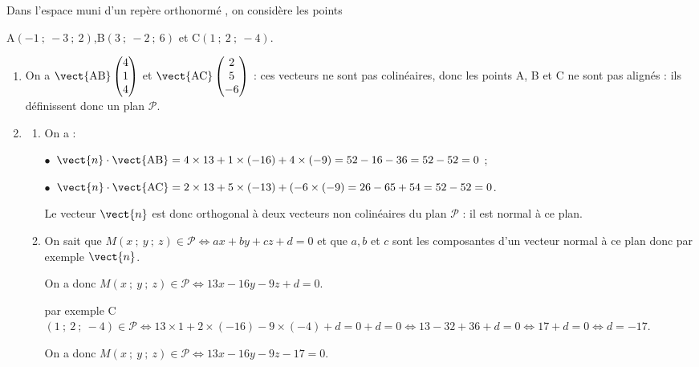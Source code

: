 \medskip

Dans l'espace muni d'un repère orthonormé \Oijk, on considère les
points
\begin{center}A$(-1~;~-3~;~2)$,\qquad B$(3~;~-2~;~6)$ \quad et \quad  C$(1~;~2~;~-4)$.\end{center}

\smallskip

\begin{enumerate}
\item 
On a $\vect{\text{AB}}\begin{pmatrix}4\\1\\4\end{pmatrix}$ et $\vect{\text{AC}}\begin{pmatrix}2\\5\\-6\end{pmatrix}$ : ces vecteurs ne sont pas colinéaires, donc les points A, B et C ne sont pas alignés : ils définissent donc un plan $\mathcal{P}$.
\item 
	\begin{enumerate}
		\item 
On a :

$\bullet~~$$\vect{n} \cdot \vect{\text{AB}} = 4 \times 13 + 1 \times (- 16) + 4 \times (-9) = 52 - 16 - 36 = 52 - 52 = 0$ ;

$\bullet~~$$\vect{n} \cdot \vect{\text{AC}} = 2 \times 13 + 5 \times (- 13) + (- 6 \times (-9) = 26 - 65 + 54  = 52 - 52 = 0$.

Le vecteur $\vect{n}$ est donc orthogonal à deux vecteurs non colinéaires du plan $\mathcal{P}$ : il est normal à ce plan.
		\item 
On sait que $M(x~;~y~;~z) \in \mathcal{P} \iff ax + by + cz + d = 0$ et que $a, b $ et $c$ sont les composantes d'un vecteur normal à ce plan donc par exemple $\vect{n}$.
		
On a donc $M(x~;~y~;~z) \in \mathcal{P} \iff 13x - 16y -9z + d = 0$.
		
par exemple C$(1~;~2~;~- 4) \in \mathcal{P} \iff 13\times 1 + 2\times  (-16) -9 \times (- 4) + d = 0   + d = 0 \iff 13 - 32 + 36 + d = 0 \iff 17 + d = 0 \iff d = - 17$.
		
On a donc $M(x~;~y~;~z) \in \mathcal{P} \iff 13x - 16y - 9z - 17 = 0$.
	\end{enumerate}
\end{enumerate}

